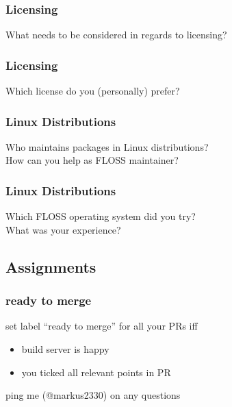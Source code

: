 \breakframe

\begin{frame}
	\frametitle{Licensing}

	\begin{task}
	What needs to be considered in regards to licensing?
	\end{task}
\end{frame}


\begin{frame}
	\frametitle{Licensing}

	\begin{task}
	Which license do you (personally) prefer?
	\end{task}
\end{frame}

\breakframe

\begin{frame}
	\frametitle{Linux Distributions}

	\begin{task}
	Who maintains packages in Linux distributions? \\
	How can you help as FLOSS maintainer?
	\end{task}
\end{frame}


\begin{frame}
	\frametitle{Linux Distributions}

	\begin{task}
	Which FLOSS operating system did you try? \\
	What was your experience?
	\end{task}
\end{frame}

\subsection{Assignments}

\begin{frame}
	\frametitle{ready to merge}

	set label ``ready to merge'' for all your PRs iff

	\begin{itemize}
	\item build server is happy
	\item you ticked all relevant points in PR
	\end{itemize}

	ping me (@markus2330) on any questions
\end{frame}

